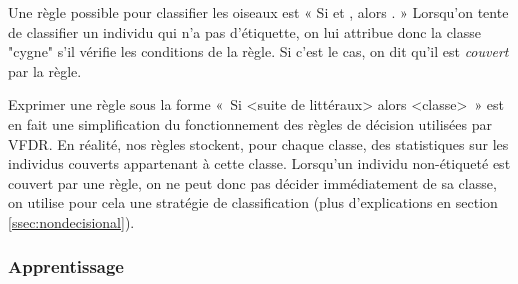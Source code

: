             Une règle possible pour classifier les oiseaux est « Si  et , alors . » Lorsqu'on tente de classifier un individu qui n'a pas d'étiquette, on lui attribue donc la classe "cygne" s'il vérifie les conditions de la règle. Si c'est le cas, on dit qu'il est \emph{couvert} par la règle.

            Exprimer une règle sous la forme «~Si <suite de littéraux> alors <classe>~» est en fait une simplification du fonctionnement des règles de décision utilisées par VFDR. En réalité, nos règles stockent, pour chaque classe, des statistiques sur les individus couverts appartenant à cette classe. Lorsqu’un individu non-étiqueté est couvert par une règle, on ne peut donc pas décider immédiatement de sa classe, on utilise pour cela une stratégie de classification (plus d'explications en section \ref{ssec:nondecisional}).


        \subsubsection{Apprentissage}\label{ssec:apprentissage}


